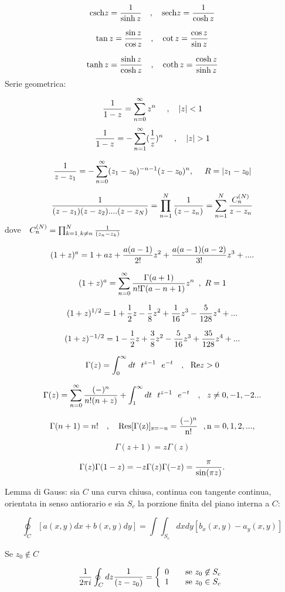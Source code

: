 \documentclass[,12pt]{article}
\begin{document}
$${\rm csch} z = {1\over \sinh z}~~~,~~~{\rm sech} z = {1\over \cosh z}$$

$$\tan z = {\sin z\over \cos z}~~~,~~~ \cot z = {\cos z\over \sin z}$$

$$\tanh z = {\sinh z\over \cosh z}~~~,~~~
 \coth z = {\cosh z\over \sinh z}$$
Serie geometrica:

$${1\over 1-z} = \sum^\infty_{n=0} z^n ~~~~ ,~~~\vert z\vert <1$$
$${1\over 1-z}=- \sum ^\infty_{n=1}({1\over z})^n~~~~,~~~
\vert z\vert >1 $$

$${1\over z-z_1}
= - \sum^\infty_{n=0} (z_1 - z_0)^{-n-1} (z-z_0)^n,~~~~ R= \vert z_1 - z_0
\vert$$

$${1\over (z-z_1) (z-z_2) ....(z-z_N)} = \prod^N_{n=1} {1\over (z-z_n)} =
\sum^N_{n=1} {C^{(N)}_n\over z-z_n}$$
dove\ \  $C^{(N)}_n = \prod^N_{k=1_,{k \neq n}} {1\over (z_n - z_k)}$

$$(1+z)^a = 1 + az + {a(a-1)\over 2!} z^2 + {a(a-1) (a-2)\over 3!}
z^3+....$$

$$(1+z)^a = \sum^\infty_{n=0} {\Gamma (a+1)\over n!\Gamma (a-n+1)} z^n
\,\,\, , \,\, R=1$$

$$(1+z)^{1/2} = 1 + {1\over 2} z - {1\over 8} z^2 + {1\over 16} z^3 -
{5\over 128} z^4+...$$

$$(1+z)^{-1/2} = 1 - {1\over 2} z + {3\over 8} z^2 - {5\over 16} z^3 +
{35\over 128} z^4+...$$

$$\Gamma (z) = \int^\infty_0 dt ~~t^{z-1}~~ e^{-t} ~~~,~~{\rm Re}z >0$$

$$\Gamma (z) = \sum^\infty_{n=0} {(-)^n\over n!(n+z)} + \int^\infty_1 dt
~~t^{z-1} ~~e^{-t} ~~~,~~ z \neq 0, -1, -2...$$

$$\Gamma (n+1) = n! ~~~, ~~~ \rm Res [\Gamma (z)]_{z=-n} =
{(-)^n\over n!}~~,n=0,1,2,...,$$

$$\Gamma (z+1) = z \Gamma (z)$$

$$\Gamma (z) \Gamma (1-z) = - z \Gamma (z) \Gamma (-z) = {\pi\over \sin
(\pi z)}.$$

\noindent
Lemma di Gauss: sia $C$  una curva chiusa, continua con tangente
continua, orientata in senso antiorario e sia $S_c$ la porzione finita
del piano interna a
$C$:

$$\oint_C [a(x,y)dx + b(x,y)dy] = \int\int_{S_c} dx dy [b_x (x,y) - a_y
(x,y)]$$

\noindent
Se $z_{0} \not \in C$

$${1\over 2\pi i} \oint_C dz {1\over (z-z_0)}=\left\{
\begin{array}{c} 0~~~~~~\mbox{se $z_0\not \in S_c$}\\
1~~~~~~\mbox{se $z_0\in S_c$}
\end{array} \right .$$
\end{document}
